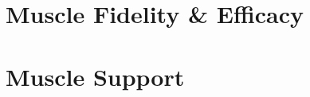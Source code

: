 

\setcounter{tocdepth}{1}
\setcounter{minitocdepth}{1} 

    \dominitoc%
    \adjustmtc[2]%
    \tableofcontents
    \label{toc-contents}

	









\part{Muscle Fidelity \& Efficacy}







\part{Muscle Support}








